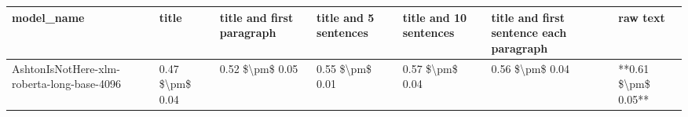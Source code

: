 \begin{tabular}{lllllll}
\toprule
                                model\_name &           title & title and first paragraph & title and 5 sentences & title and 10 sentences & title and first sentence each paragraph &            raw text \\
\midrule
AshtonIsNotHere-xlm-roberta-long-base-4096 & 0.47 \$\textbackslash pm\$ 0.04 &           0.52 \$\textbackslash pm\$ 0.05 &       0.55 \$\textbackslash pm\$ 0.01 &        0.57 \$\textbackslash pm\$ 0.04 &                         0.56 \$\textbackslash pm\$ 0.04 & **0.61 \$\textbackslash pm\$ 0.05** \\
\bottomrule
\end{tabular}
